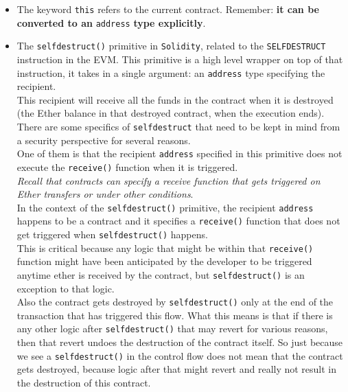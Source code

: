 \begin{itemize}
\item
  The keyword \texttt{this} refers to the current contract. Remember:
  \textbf{it can be converted to an} \texttt{address} \textbf{type
  explicitly}.
\item
  The \texttt{selfdestruct()} primitive in \texttt{Solidity}, related to
  the \texttt{SELFDESTRUCT} instruction in the EVM. This primitive is a
  high level wrapper on top of that instruction, it takes in a single
  argument: an \texttt{address} type specifying the recipient.\\

  This recipient will receive all the funds in the contract when it is
  destroyed (the Ether balance in that destroyed contract, when the
  execution ends). There are some specifics of \texttt{selfdestruct}
  that need to be kept in mind from a security perspective for several
  reasons.\\

  One of them is that the recipient \texttt{address} specified in this
  primitive does not execute the \texttt{receive()} function when it is
  triggered.\\

  \emph{Recall that contracts can specify a receive function that gets
  triggered on Ether transfers or under other conditions}.\\

  In the context of the \texttt{selfdestruct()} primitive, the recipient
  \texttt{address} happens to be a contract and it specifies a
  \texttt{receive()} function that does not get triggered when
  \texttt{selfdestruct()} happens.\\

  This is critical because any logic that might be within that
  \texttt{receive()} function might have been anticipated by the
  developer to be triggered anytime ether is received by the contract,
  but \texttt{selfdestruct()} is an exception to that logic.\\

  Also the contract gets destroyed by \texttt{selfdestruct()} only at
  the end of the transaction that has triggered this flow. What this
  means is that if there is any other logic after
  \texttt{selfdestruct()} that may revert for various reasons, then that
  revert undoes the destruction of the contract itself. So just because
  we see a \texttt{selfdestruct()} in the control flow does not mean
  that the contract gets destroyed, because logic after that might
  revert and really not result in the destruction of this contract.
\end{itemize}

